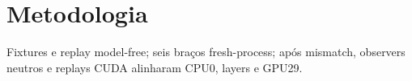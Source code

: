 \section{Metodologia}
Fixtures e replay model-free; seis braços fresh-process; após mismatch, observers neutros e replays CUDA alinharam CPU0, layers e GPU29. 
